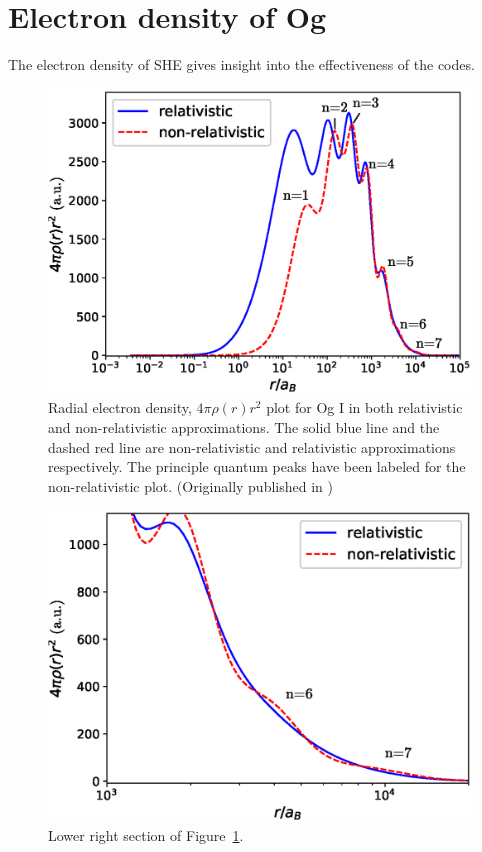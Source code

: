 \documentclass[10pt,a4paper, twoside, openright]{report}
\begin{document}
\section{Electron density of  Og} \label{sec:Relativistic}
The electron density of SHE gives insight into the effectiveness of the codes.
\begin{figure} 
\includegraphics[scale=0.8]{./figures/Ogplot.eps}
\caption[Relativistic and non-relativistic radial electron density of Og I.]{Radial electron density, $4\pi\rho(r)r^2$ plot for Og I in both relativistic and non-relativistic approximations. The solid blue line and the dashed red line are non-relativistic and relativistic approximations respectively. The principle quantum peaks have been labeled for the non-relativistic plot. (Originally published in \cite{LDFOg2018})\label{Og_plot}}
\end{figure}
\begin{figure}
\includegraphics[scale=0.8]{./figures/Ogplot_zoom.eps}
\caption{Lower right section of  Figure~\ref{Og_plot}.\label{Og_plot_zoom}}
\end{figure}
\end{document}
